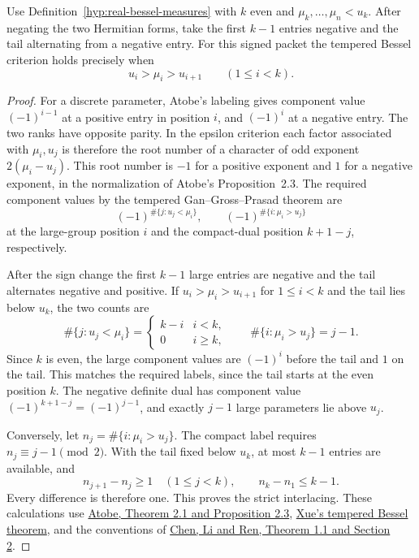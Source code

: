 \begin{proposition}
Use Definition~\ref{hyp:real-bessel-measures} with \(k\) even and
\(\mu_k,\ldots,\mu_n<u_k\). After negating the two Hermitian
forms, take the first \(k-1\) entries negative and the tail
alternating from a negative entry. For this signed packet the tempered Bessel criterion holds precisely when 
\[
 u_i>\mu_i>u_{i+1}\qquad(1\le i<k).
\]

\end{proposition}

\begin{proof}
For a discrete parameter, Atobe's labeling gives component value
\((-1)^{i-1}\) at a positive entry in position \(i\), and \((-1)^i\)
at a negative entry. The two ranks have opposite parity. In the
epsilon criterion each factor associated with \(\mu_i,u_j\) is
therefore the root number of a character of odd exponent
\(2(\mu_i-u_j)\). This root number is \(-1\) for a positive exponent
and \(1\) for a negative exponent, in the normalization of Atobe's
Proposition~2.3. The required component values by the tempered
Gan--Gross--Prasad theorem are
\[
 (-1)^{\#\{j:u_j<\mu_i\}},\qquad
 (-1)^{\#\{i:\mu_i>u_j\}}
\]
at the large-group position \(i\) and the compact-dual position
\(k+1-j\), respectively.

After the sign change the first \(k-1\) large entries are negative
and the tail alternates negative and positive. If
\(u_i>\mu_i>u_{i+1}\) for \(1\le i<k\) and the tail lies below
\(u_k\), the two counts are
\[
 \#\{j:u_j<\mu_i\}=\begin{cases}k-i&i<k,\\0&i\ge k,\end{cases}
 \qquad \#\{i:\mu_i>u_j\}=j-1.
\]
Since \(k\) is even, the large component values are \((-1)^i\)
before the tail and \(1\) on the tail. This matches the required labels, since the
tail starts at the even position \(k\). The negative definite dual
has component value \((-1)^{k+1-j}=(-1)^{j-1}\), and exactly \(j-1\)
large parameters lie above \(u_j\).

Conversely, let \(n_j=\#\{i:\mu_i>u_j\}\). The compact label
requires \(n_j\equiv j-1\pmod2\). With the tail fixed below
\(u_k\), at most \(k-1\) entries are available, and
\[
   n_{j+1}-n_j\ge1\quad(1\le j<k),\qquad n_k-n_1\le k-1.
\]
Every difference is therefore one. This proves the strict interlacing.
These calculations use \href{https://eprints.lib.hokudai.ac.jp/repo/huscap/all/84508/Adv.%20math%20363_106984.pdf}{Atobe, Theorem 2.1 and Proposition 2.3},
\href{https://doi.org/10.1215/00127094-2022-0018}{Xue's tempered Bessel theorem},
and the conventions of \href{https://arxiv.org/html/2610.29483v1}{Chen, Li and Ren, Theorem 1.1 and Section 2}.

\end{proof}

